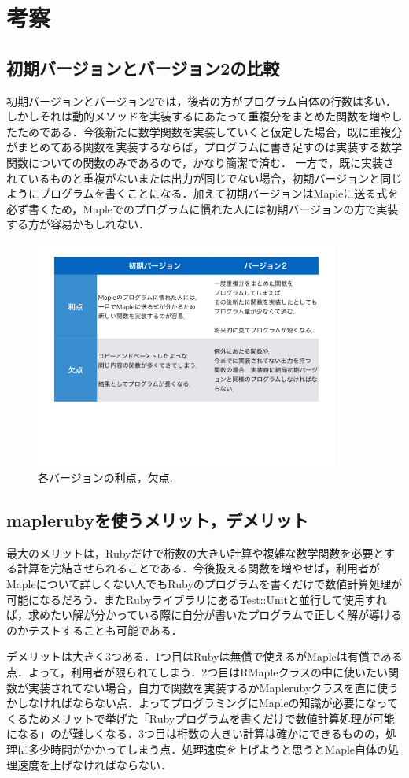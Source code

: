 \section{考察}
\subsection{初期バージョンとバージョン2の比較}
初期バージョンとバージョン2では，後者の方がプログラム自体の行数は多い．しかしそれは動的メソッドを実装するにあたって重複分をまとめた関数を増やしたためである．今後新たに数学関数を実装していくと仮定した場合，既に重複分がまとめてある関数を実装するならば，プログラムに書き足すのは実装する数学関数についての関数のみであるので，かなり簡潔で済む．
一方で，既に実装されているものと重複がないまたは出力が同じでない場合，初期バージョンと同じようにプログラムを書くことになる．加えて初期バージョンはMapleに送る式を必ず書くため，Mapleでのプログラムに慣れた人には初期バージョンの方で実装する方が容易かもしれない．

\begin{figure}[htbp]\begin{center}
\includegraphics[width=10cm,bb= 0 0 737 553]{../figs/./mapleruby_eringi.009.png}
\caption{各バージョンの利点，欠点.}
\label{default}\end{center}\end{figure}
\subsection{maplerubyを使うメリット，デメリット}
最大のメリットは，Rubyだけで桁数の大きい計算や複雑な数学関数を必要とする計算を完結させられることである．今後扱える関数を増やせば，利用者がMapleについて詳しくない人でもRubyのプログラムを書くだけで数値計算処理が可能になるだろう．またRubyライブラリにあるTest::Unitと並行して使用すれば，求めたい解が分かっている際に自分が書いたプログラムで正しく解が導けるのかテストすることも可能である．

デメリットは大きく3つある．1つ目はRubyは無償で使えるがMapleは有償である点．よって，利用者が限られてしまう．2つ目はRMapleクラスの中に使いたい関数が実装されてない場合，自力で関数を実装するかMaplerubyクラスを直に使うかしなければならない点．よってプログラミングにMapleの知識が必要になってくるためメリットで挙げた「Rubyプログラムを書くだけで数値計算処理が可能になる」のが難しくなる．3つ目は桁数の大きい計算は確かにできるものの，処理に多少時間がかかってしまう点．処理速度を上げようと思うとMaple自体の処理速度を上げなければならない．

